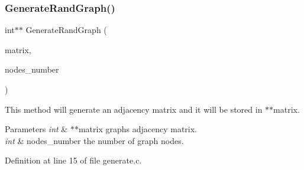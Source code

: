 \subsubsection{Generate\+Rand\+Graph()}
{\footnotesize\ttfamily int$\ast$$\ast$ Generate\+Rand\+Graph (\begin{DoxyParamCaption}\item[{int $\ast$$\ast$}]{matrix,  }\item[{int $\ast$}]{nodes\+\_\+number }\end{DoxyParamCaption})}



This method will generate an adjacency matrix and it will be stored in $\ast$$\ast$matrix. 


\begin{DoxyParams}{Parameters}
{\em int} & $\ast$$\ast$matrix graph\textquotesingle{}s adjacency matrix. \\
\hline
{\em int} & nodes\+\_\+number the number of graph nodes. \\
\hline
\end{DoxyParams}


Definition at line 15 of file generate.\+c.

